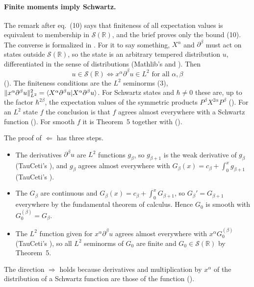 \documentclass[11pt]{article}
\begin{document}
\paragraph{Finite moments imply Schwartz.} The remark after eq.~(10) says that finiteness of
all expectation values is equivalent to membership in $\mathcal{S}(\mathbb{R})$, and the brief
proves only the bound (10). The converse is formalized in . For it to
say something, $X^\alpha$ and $\partial^\beta$ must act on states outside
$\mathcal{S}(\mathbb{R})$, so the state is an arbitrary tempered distribution $u$, differentiated
in the sense of distributions (Mathlib's  and
). Then
\[
  u \in \mathcal{S}(\mathbb{R}) \iff x^\alpha \partial^\beta u \in L^2 \text{ for all }
  \alpha, \beta
\]
(). The finiteness conditions are the $L^2$ seminorms
(3), $\|x^\alpha \partial^\beta u\|_{L^2}^2 = \braket{X^\alpha \partial^\beta u | X^\alpha
\partial^\beta u}$. For Schwartz states and $\hbar \ne 0$ these are, up to the factor
$\hbar^{2\beta}$, the expectation values of the symmetric products $P^\beta X^{2\alpha} P^\beta$
().
For an $L^2$ state $f$ the conclusion is that $f$ agrees almost everywhere with a Schwartz
function (). For smooth $f$ it is Theorem~5 together with
 ().

The proof of $\Leftarrow$ has three steps.
\begin{itemize}
\item The derivatives $\partial^\beta u$ are $L^2$ functions $g_\beta$, so $g_{\beta+1}$ is the
  weak derivative of $g_\beta$ (TauCeti's
  ), and $g_\beta$ agrees
  almost everywhere with $G_\beta(x) = c_\beta + \int_0^x g_{\beta+1}$ (TauCeti's
  ).
\item The $G_\beta$ are continuous and $G_\beta(x) = c_\beta + \int_0^x G_{\beta+1}$, so
  $G_\beta' = G_{\beta+1}$ everywhere by the fundamental theorem of calculus. Hence $G_0$ is
  smooth with $G_0^{(\beta)} = G_\beta$.
\item The $L^2$ function given for $x^\alpha \partial^\beta u$ agrees almost everywhere with
  $x^\alpha G_0^{(\beta)}$ (TauCeti's ), so
  all $L^2$ seminorms of $G_0$ are finite and $G_0 \in \mathcal{S}(\mathbb{R})$ by Theorem~5.
\end{itemize}
The direction $\Rightarrow$ holds because derivatives and multiplication by $x^\alpha$ of the
distribution of a Schwartz function are those of the function
().
\end{document}
